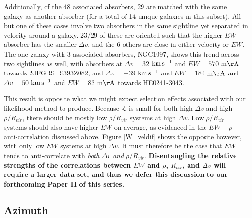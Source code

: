\documentclass[twocolumn,tighten]{aastex6}
\begin{document}
Additionally, of the 48 associated absorbers, 29 are matched with the same galaxy as another absorber (for a total of 14 unique galaxies in this subset). All but one of these cases involve two absorbers in the same sightline yet separated in velocity around a galaxy. 23/29 of these are oriented such that the higher $EW$ absorber has the smaller $\Delta v$, and the 6 others are close in either velocity or $EW$. The one galaxy with 3 associated absorbers, NGC1097, shows this trend across two sightlines as well, with absorbers at $\Delta v = 32$ $\rm km\, s^{-1}$ and $EW = 570$ $\rm m\AA$ towards 2dFGRS\_S393Z082, and $\Delta v = -39$ $\rm km\, s^{-1}$ and $EW = 184$ $\rm m\AA$ and $\Delta v = 50$ $\rm km\, s^{-1}$ and $EW = 83$ $\rm m\AA$ towards HE0241-3043.

This result is opposite what we might expect selection effects associated with our likelihood method to produce. Because $\mathcal{L}$ is small for both high $\Delta v$ and high $\rho / R_{vir}$, there should be mostly low $\rho / R_{vir}$ systems at high $\Delta v$. Low $\rho / R_{vir}$ systems should also have higher $EW$ on average, as evidenced in the $EW-\rho$ anti-correlation discussed above. Figure \ref{W_veldif} shows the opposite however, with only low $EW$ systems at high $\Delta v$. It must therefore be the case that $EW$ tends to anti-correlate with \textit{both} $\Delta v$ \textit{and} $\rho / R_{vir}$. \textbf{Disentangling the relative strengths of the correlations between $EW$ and $\rho$, $R_{vir}$, and $\Delta v$ will require a larger data set, and thus we defer this discussion to our forthcoming Paper II of this series.}

\vspace{10pt}

\subsection{Azimuth}
\label{azimuth}
\end{document}
